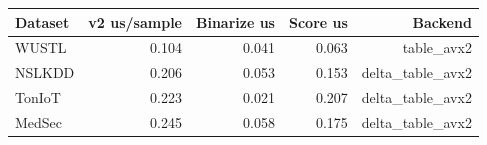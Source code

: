 \begin{tabular}{lrrrr}
\toprule
Dataset & v2 us/sample & Binarize us & Score us & Backend \\
\midrule
WUSTL & 0.104 & 0.041 & 0.063 & table\_avx2 \\
NSLKDD & 0.206 & 0.053 & 0.153 & delta\_table\_avx2 \\
TonIoT & 0.223 & 0.021 & 0.207 & delta\_table\_avx2 \\
MedSec & 0.245 & 0.058 & 0.175 & delta\_table\_avx2 \\
\bottomrule
\end{tabular}

